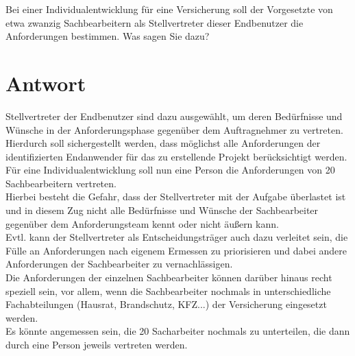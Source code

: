 Bei einer Individualentwicklung für eine Versicherung soll der Vorgesetzte von etwa
zwanzig Sachbearbeitern als Stellvertreter dieser Endbenutzer die Anforderungen
bestimmen. Was sagen Sie dazu?


\section*{Antwort}

Stellvertreter der Endbenutzer sind dazu ausgewählt, um deren Bedürfnisse und Wünsche in der Anforderungsphase gegenüber dem Auftragnehmer zu vertreten.\\
Hierdurch soll sichergestellt werden, dass möglichst alle Anforderungen der identifizierten Endanwender für das zu erstellende Projekt berücksichtigt werden.\\
Für eine Individualentwicklung soll nun eine Person die Anforderungen von 20 Sachbearbeitern vertreten.\\
Hierbei besteht die Gefahr, dass der Stellvertreter mit der Aufgabe überlastet ist und in diesem Zug nicht alle Bedürfnisse und Wünsche der Sachbearbeiter gegenüber dem Anforderungsteam kennt oder nicht äußern kann.\\
Evtl. kann der Stellvertreter als Entscheidungsträger auch dazu verleitet sein, die Fülle an Anforderungen nach eigenem Ermessen zu priorisieren und dabei andere Anforderungen der Sachbearbeiter zu vernachlässigen.\\

\noindent
Die Anforderungen der einzelnen Sachbearbeiter können darüber hinaus recht speziell sein, vor allem, wenn die Sachbearbeiter nochmals in unterschiedliche Fachabteilungen (Hausrat, Brandschutz, KFZ...) der Versicherung eingesetzt werden.\\
Es könnte angemessen sein, die 20 Sacharbeiter nochmals zu unterteilen, die dann durch eine Person jeweils vertreten werden.